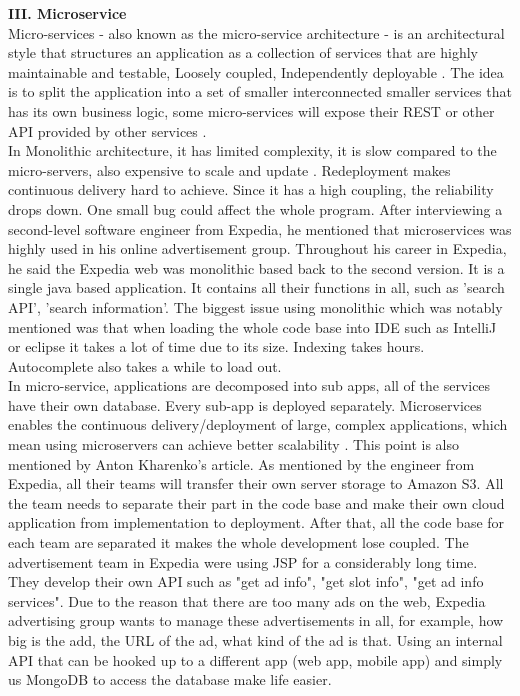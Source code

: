 \documentclass[11pt]{article}
\begin{document}
{\bf III. Microservice}\\[10px]
Micro-services - also known as the micro-service architecture - is an architectural style that structures an application as a collection of services that are highly maintainable and testable, Loosely coupled, Independently deployable \cite{no7}. The idea is to split the application into a set of smaller interconnected smaller services that has its own business logic, some micro-services will expose their REST or other API provided by other services \cite{no8}. \\[10px]
In Monolithic architecture, it has limited complexity, it is slow compared to the micro-servers, also expensive to scale and update \cite{no8}. Redeployment makes continuous delivery hard to achieve. Since it has a high coupling, the reliability drops down. One small bug could affect the whole program. After interviewing a second-level software engineer from Expedia, he mentioned that microservices was highly used in his online advertisement group. Throughout his career in Expedia, he said the Expedia web was monolithic based back to the second version. It is a single java based application. It contains all their functions in all, such as 'search API', 'search information'. The biggest issue using monolithic which was notably mentioned was that when loading the whole code base into IDE such as IntelliJ or eclipse it takes a lot of time due to its size. Indexing takes hours. Autocomplete also takes a while to load out.  \\[10px]
In micro-service, applications are decomposed into sub apps, all of the services have their own database. Every sub-app is deployed separately. Microservices enables the continuous delivery/deployment of large, complex applications, which mean using microservers can achieve better scalability \cite{no8}. This point is also mentioned by Anton Kharenko's article. As mentioned by the engineer from Expedia, all their teams will transfer their own server storage to Amazon S3. All the team needs to separate their part in the code base and make their own cloud application from implementation to deployment. After that, all the code base for each team are separated it makes the whole development lose coupled. The advertisement team in Expedia were using JSP for a considerably long time. They develop their own API such as "get ad info", "get slot info", "get ad info services". Due to the reason that there are too many ads on the web, Expedia advertising group wants to manage these advertisements in all, for example, how big is the add, the URL of the ad, what kind of the ad is that. Using an internal API that can be hooked up to a different app (web app, mobile app) and simply us MongoDB to access the database make life easier. \\[10px]
\end{document}
